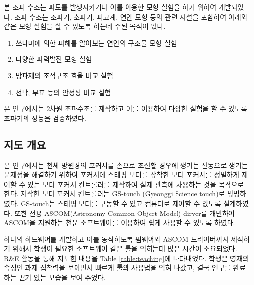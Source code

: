 본 조파 수조는 파도를 발생시카거나 이를 이용한 모형 실험을 하기 위하여 개발되었다. 조파 수조는 조파기, 소파기, 파고계, 연안 모형 등의 관련 시설을 포함하여 아래와 같은 모형 실험을 할 수 있도록 하는데 주된 목적이 있다.

\begin{enumerate}
    \item 쓰나미에 의한 피해를 알아보는 연안의 구조물 모형 실험
    \item 다양한 파력발전 모형 실험
    \item 방파제의 조적구조 효율 비교 실험
    \item 선박, 부표 등의 안정성 비교 실험
\end{enumerate}

본 연구에서는 2차원 조파수조를 제작하고 이를 이용하여 다양한 실험을 할 수 있도록 조파기의 성능을 검증하였다. 


\subsection{지도 개요}

본 연구에서는 천체 망원경의 포커서를 손으로 조절할 경우에 생기는 진동으로 생기는 문제점을 해결하기 위하여 포커서에 스테핑 모터를 장착한 모터 포커서를 정밀하게 제어할 수 있는 모터 포커서 컨트롤러를 제작하여 실제 관측에 사용하는 것을 목적으로 한다. 제작한 모터 포커서 컨트롤러는 GS-touch (Gyeonggi Science touch)로 명명하였다. GS-touch는 스테핑 모터를 구동할 수 있고 컴퓨터로 제어할 수 있도록 설계하였다. 또한 전용 ASCOM(Astronomy Common Object Model) dirver를 개발하여 ASCOM을 지원하는 천문 소프트웨어를 이용하여 쉽게 사용할 수 있도록 하였다. 

하나의 하드웨어를 개발하고 이를 동작하도록 펌웨어와 ASCOM 드라이버까지 제작하기 위해서 학생이 필요한 소프트웨어 같은 툴을 익히는데 많은 시간이 소요되었다. R\&E 활동을 통해 지도한 내용을 Table \ref{table:teaching}에 나타내었다. 학생은 영재의 속성인 과제 집착력을 보이면서 빠르게 툴의 사용법을 익혀 나갔고, 결국 연구를 완료하는 끈기 있는 모습을 보여 주었다. 

